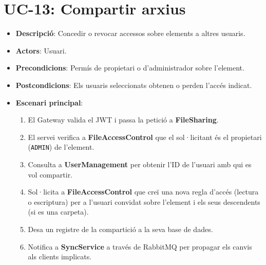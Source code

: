 \section{UC-13: Compartir arxius}
\begin{itemize}
  \item \textbf{Descripció}: Concedir o revocar accessos sobre elements a altres usuaris.
  \item \textbf{Actors}: Usuari.
  \item \textbf{Precondicions}: Permís de propietari o d'administrador sobre l'element.
  \item \textbf{Postcondicions}: Els usuaris seleccionats obtenen o perden l'accés indicat.
  \item \textbf{Escenari principal}:
    \begin{enumerate}
        \item El Gateway valida el JWT i passa la petició a \textbf{FileSharing}.
        \item El servei verifica a \textbf{FileAccessControl} que el sol·licitant és el propietari (\texttt{ADMIN}) de l'element.
        \item Consulta a \textbf{UserManagement} per obtenir l'ID de l'usuari amb qui es vol compartir.
        \item Sol·licita a \textbf{FileAccessControl} que creï una nova regla d'accés (lectura o escriptura) per a l'usuari convidat sobre l'element i els seus descendents (si es una carpeta).
        \item Desa un registre de la compartició a la seva base de dades.
        \item Notifica a \textbf{SyncService} a través de RabbitMQ per propagar els canvis als clients implicats.
    \end{enumerate}
\end{itemize}

